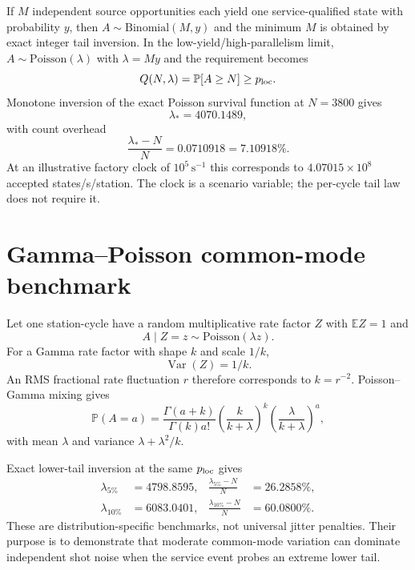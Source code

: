 \documentclass[aps,prx,preprint,superscriptaddress,nofootinbib,longbibliography]{revtex4-2}
\newcommand{\E}{\mathbb E}\newcommand{\Prob}{\mathbb P}
\begin{document}
If $M$ independent source opportunities each yield one service-qualified state with probability $y$, then $A\sim\mathrm{Binomial}(M,y)$ and the minimum $M$ is obtained by exact integer tail inversion. In the low-yield/high-parallelism limit, $A\sim\mathrm{Poisson}(\lambda)$ with $\lambda=My$ and the requirement becomes
\begin{equation}
Q(N,\lambda)=\Prob[A\ge N]\ge p_{\rm loc}.
\end{equation}
Monotone inversion of the exact Poisson survival function at $N=3800$ gives
\begin{equation}
\boxed{\lambda_*=4070.1489},
\end{equation}
with count overhead
\begin{equation}
\frac{\lambda_*-N}{N}=0.0710918=7.10918\%.
\end{equation}
At an illustrative factory clock of $10^5\,\mathrm{s}^{-1}$ this corresponds to $4.07015\times10^8$ accepted states/s/station. The clock is a scenario variable; the per-cycle tail law does not require it.

\section{Gamma--Poisson common-mode benchmark}
Let one station-cycle have a random multiplicative rate factor $Z$ with $\E Z=1$ and
\begin{equation}
A\mid Z=z\sim\mathrm{Poisson}(\lambda z).
\end{equation}
For a Gamma rate factor with shape $k$ and scale $1/k$,
\begin{equation}
\operatorname{Var}(Z)=1/k.
\end{equation}
An RMS fractional rate fluctuation $r$ therefore corresponds to $k=r^{-2}$. Poisson--Gamma mixing gives
\begin{equation}
\Prob(A=a)=\frac{\Gamma(a+k)}{\Gamma(k)a!}
\left(\frac{k}{k+\lambda}\right)^k
\left(\frac{\lambda}{k+\lambda}\right)^a,
\end{equation}
with mean $\lambda$ and variance $\lambda+\lambda^2/k$.

Exact lower-tail inversion at the same $p_{\rm loc}$ gives
\begin{align}
\lambda_{5\%}&=4798.8595, & \frac{\lambda_{5\%}-N}{N}&=26.2858\%,\\
\lambda_{10\%}&=6083.0401, & \frac{\lambda_{10\%}-N}{N}&=60.0800\%.
\end{align}
These are distribution-specific benchmarks, not universal jitter penalties. Their purpose is to demonstrate that moderate common-mode variation can dominate independent shot noise when the service event probes an extreme lower tail.
\end{document}
